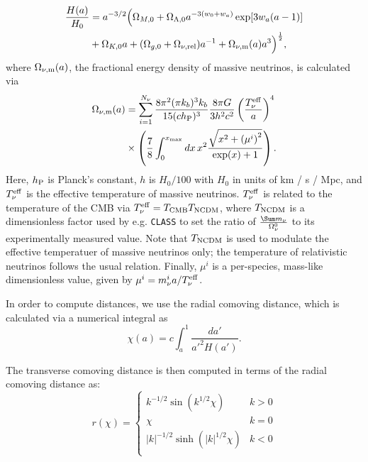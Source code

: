 \documentclass[\docopts]{\docclass}
\begin{document}
\begin{align}\label{eq:Ha}
\frac{H(a)}{H_0} &= a^{-3/2}\Big(\Omega_{M,0}+\Omega_{\Lambda,0} a^{-3(w_0+w_a)}
    \exp[3 w_a (a-1)]\nonumber \\ &+\Omega_{K,0} a +(\Omega_{g,0} + \Omega_{\nu, {\rm rel}}) a^{-1} + \Omega_{\nu, {\rm m}}(a)a^3\Big)^{\frac{1}{2}},
\end{align}
where $\Omega_{\nu, {\rm m}}(a)$, the fractional energy density of massive neutrinos, is calculated via
\begin{align}
\Omega_{\nu, {\rm m}}(a) &= \sum_{i=1}^{N_\nu} \frac{8 \pi^2(\pi k_b )^3 k_b}{15(c h_{\rm P})^3} \frac{8 \pi G}{3h^2c^2} \left(\frac{T_{\nu}^{\rm eff}}{a}\right)^4 \nonumber \\ & \times \left(\frac{7}{8}\int_0^{x_{\rm max}} dx \, x^2 \frac{\sqrt{x^2 + \left(\mu^i\right)^2}}{\exp(x) + 1}\right).
\label{Omnu}
\end{align}
Here, $h_{\rm P}$ is Planck's constant, $h$ is $H_0/100$ with $H_0$ in units of km / s / Mpc, and $T_{\nu}^{\rm eff}$ is the effective temperature of massive neutrinos. $T_{\nu}^{\rm eff}$ is related to the temperature of the CMB via $T_{\nu}^{\rm eff} = T_{\rm CMB} T_{\rm NCDM}$, where $T_{\rm NCDM}$ is a dimensionless factor used by e.g. {\tt CLASS} to set the ratio of $\frac{\Sum m_\nu}{\Omega_{\nu}^0}$ to its experimentally measured value. Note that $T_{\rm NCDM}$ is used to modulate the effective temperatuer of massive neutrinos only; the temperature of relativistic neutrinos follows the usual relation. Finally, $\mu^i$ is a per-species, mass-like dimensionless value, given by $\mu^i = m_{\nu}^{i}a / T_{\nu}^{\rm eff}$. 

In order to compute distances, we use the radial comoving distance, which is calculated via a numerical integral as
\begin{equation}
 \chi(a)= c \int_a^1 \frac{da'}{a'^2 H(a')}.
\end{equation}

The transverse comoving distance is then computed in terms of the radial comoving distance as:
\begin{equation}\label{eq:angdist}
 r(\chi)=\left\{\begin{array}{cc}
                 k^{-1/2}\sin(k^{1/2}\chi) & k>0\\
                 \chi & k=0\\
                 |k|^{-1/2}\sinh(|k|^{1/2}\chi) & k<0\\
                \end{array}\right.
\end{equation}
\end{document}
